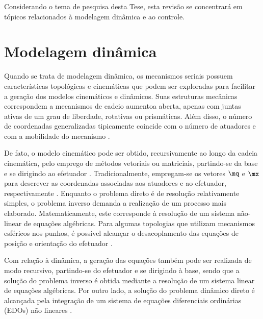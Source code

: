 \documentclass[]{politex}
\begin{document}
Considerando o tema de pesquisa desta Tese, esta revisão se concentrará em tópicos relacionados à modelagem dinâmica e ao controle.


\section{Modelagem dinâmica}

Quando se trata de modelagem dinâmica, os mecanismos seriais possuem características topológicas e cinemáticas que podem ser exploradas para facilitar a geração dos modelos cinemáticos e dinâmicos. Suas estruturas mecânicas correspondem a mecanismos de cadeio aumentoa aberta, apenas com juntas ativas de um grau de liberdade, rotativas ou prismáticas. Além disso, o número de coordenadas generalizadas tipicamente coincide com o número de atuadores e com a mobilidade do mecanismo \cite{Craig}. 

De fato, o modelo cinemático pode ser obtido, recursivamente ao longo da cadeia cinemática, pelo emprego de métodos vetoriais ou matriciais, partindo-se da base e se dirigindo ao efetuador \cite{Siciliano}. Tradicionalmente, empregam-se os vetores $\mq$ e $\mx$ para descrever as coordenadas associadas aos atuadores e ao efetuador, respectivamente \cite{Cabral, Carvalho}. Enquanto o problema direto é de resolução relativamente simples, o problema inverso demanda a realização de um processo mais elaborado. Matematicamente, este corresponde à resolução de um sistema não-linear de equações algébricas. Para algumas topologias que utilizam mecanismos esféricos nos punhos, é possível alcançar o desacoplamento das equações de posição e orientação do efetuador \cite{Waldron}.

Com relação à dinâmica, a geração das equações também pode ser realizada de modo recursivo, partindo-se do efetuador e se dirigindo à base, sendo que a solução do problema inverso é obtida mediante a resolução de um sistema linear de equações algébricas. Por outro lado, a solução do problema dinâmico direto é alcançada pela integração de um sistema de equações diferenciais ordinárias (EDOs) não lineares \cite{Featherstone}.

\end{document}
